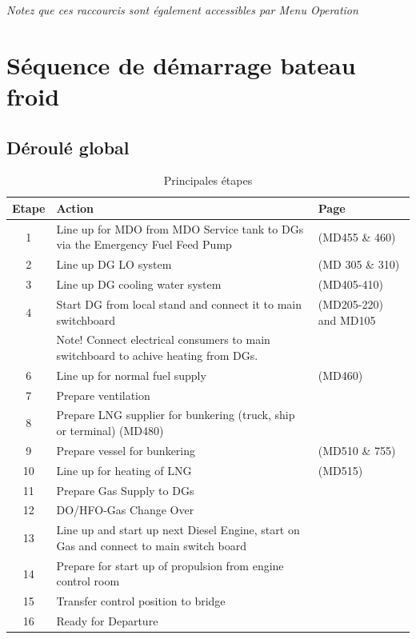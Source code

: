 \documentclass[12pt,a4paper]{article}
\begin{document}
\emph{Notez que ces raccourcis sont également accessibles par \emph{Menu} \emph{Operation}}


\section{Séquence de démarrage bateau froid}

\subsection{Déroulé global}

\begin{table}[htbp]
\scriptsize
\begin{tabular}{||c||l||l||}
\hline
Etape & Action & Page  \\ \hline
1 &  Line up for MDO from MDO Service tank to DGs via the Emergency Fuel Feed Pump & (MD455 \& 460) \\ \hline
2 &  Line up DG LO system & (MD 305 \& 310) \\ \hline
3 &  Line up DG cooling water system& (MD405-410) \\ \hline
4 &  Start DG from local stand and connect it to main switchboard & (MD205-220) and MD105 \\ 
& Note! Connect electrical consumers to main switchboard to achive heating from DGs. & \\ \hline
6 &  Line up for normal fuel supply & (MD460) \\ \hline
7 &  Prepare ventilation & \\ \hline
8 &  Prepare LNG supplier for bunkering (truck, ship or terminal) (MD480) &\\ \hline
9 &  Prepare vessel for bunkering &(MD510 \& 755) \\ \hline
10 &  Line up for heating of LNG & (MD515) \\ \hline
11 &  Prepare Gas Supply to DGs & \\ \hline
12 &  DO/HFO-Gas Change Over &\\ \hline
13 &  Line up and start up next Diesel Engine, start on Gas and connect to main switch board &\\ \hline
14 &  Prepare for start up of propulsion from engine control room &\\ \hline
15 &  Transfer control position to bridge &\\ \hline
16 & Ready for Departure &\\ \hline
\end{tabular}
\caption{Principales étapes}
\label{}
\end{table}
\end{document}
